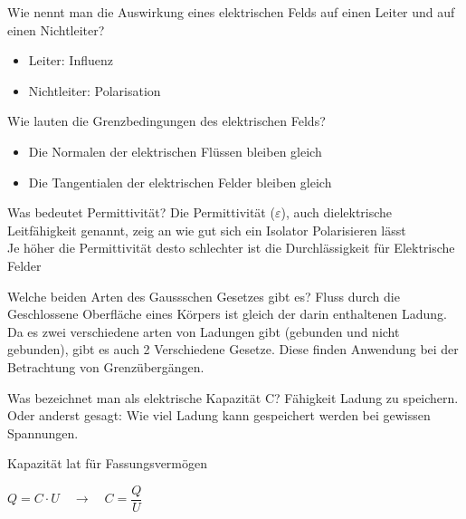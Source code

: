 \begin{lk}{Wie nennt man die Auswirkung eines elektrischen Felds auf einen Leiter und auf einen Nichtleiter?}
	\begin{itemize}
		\item Leiter: Influenz
		\item Nichtleiter: Polarisation
	\end{itemize}
\end{lk}	

\begin{lk}{Wie lauten die Grenzbedingungen des elektrischen Felds?} %
	\begin{itemize}
		\item Die Normalen der elektrischen Flüssen bleiben gleich
		\item Die Tangentialen der elektrischen Felder bleiben gleich
	\end{itemize}
\end{lk}	


\begin{lk}{Was bedeutet Permittivität?}
	Die Permittivität ($ \varepsilon $), auch dielektrische Leitfähigkeit genannt, zeig an wie gut sich ein Isolator Polarisieren lässt\\
	Je höher die Permittivität desto schlechter ist die Durchlässigkeit für Elektrische Felder
\end{lk}	

\begin{lk}{Welche beiden Arten des Gaussschen Gesetzes gibt es?}
	Fluss durch die Geschlossene Oberfläche eines Körpers ist gleich der darin enthaltenen Ladung.\\[12pt]
	Da es zwei verschiedene arten von Ladungen gibt (gebunden und nicht gebunden), gibt es auch 2 Verschiedene Gesetze. Diese finden Anwendung bei der Betrachtung von Grenzübergängen.
\end{lk}

\begin{lk}{Was bezeichnet man als elektrische Kapazität C?}
	Fähigkeit Ladung zu speichern. Oder anderst gesagt: Wie viel Ladung kann gespeichert werden bei gewissen Spannungen.
	
	Kapazität lat für Fassungsvermögen
	
	\huge{$ Q = C \cdot U \quad \rightarrow \quad C = \dfrac{Q}{U}$}
\end{lk}	

